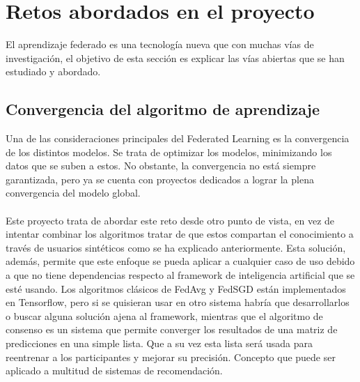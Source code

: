 \section{Retos abordados en el proyecto}
El aprendizaje federado es una tecnología nueva que con muchas vías de investigación, el objetivo de esta sección es explicar las vías abiertas que se han estudiado y abordado. 
\subsection{Convergencia del algoritmo de aprendizaje}
Una de las consideraciones principales del Federated Learning es la convergencia de los distintos modelos. Se trata de optimizar los modelos, minimizando los datos que se suben a estos. No obstante, la convergencia no está siempre garantizada, pero ya se cuenta con proyectos dedicados a lograr la plena convergencia del modelo global.
\\ \\
Este proyecto trata de abordar este reto desde otro punto de vista, en vez de intentar combinar los algoritmos tratar de que estos compartan el conocimiento a través de usuarios sintéticos como se ha explicado anteriormente. Esta solución, además, permite que este enfoque se pueda aplicar a cualquier caso de uso debido a que no tiene dependencias respecto al framework de inteligencia artificial que se esté usando. Los algoritmos clásicos de FedAvg y FedSGD están implementados en Tensorflow, pero si se quisieran usar en otro sistema habría que desarrollarlos o buscar alguna solución ajena al framework, mientras que el algoritmo de consenso es un sistema que permite converger los resultados de una matriz de predicciones en una simple lista. Que a su vez esta lista será usada para reentrenar a los participantes y mejorar su precisión. Concepto que puede ser aplicado a multitud de sistemas de recomendación.


